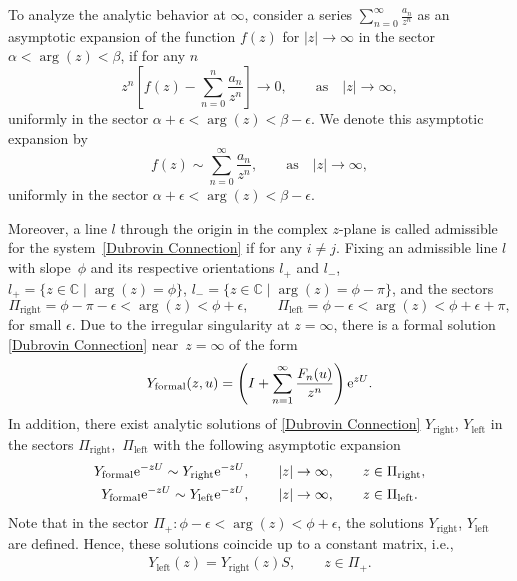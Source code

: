 \documentclass[pdftex]{sigma}
\numberwithin{equation}{section}
\begin{document}
To analyze the analytic behavior at $\infty$, consider a series
$\sum_{n=0}^{\infty} \frac{a_n}{z^n}$
as an asymptotic expansion of the function $f(z)$ for
$
\lvert z \rvert \to \infty$ in the sector $\alpha < \arg(z) < \beta$,
if for any $n$
\[
z^n\left[f(z)- \sum_{n=0}^{n} \frac{a_n}{z^n} \right] \to 0, \qquad \text{as} \quad \lvert z \rvert \to \infty,
\]
uniformly in the sector $ \alpha+\epsilon < \arg(z) < \beta-\epsilon$.
We denote this asymptotic expansion by{\samepage
\[
f(z)\sim\sum_{n=0}^{\infty} \frac{a_n}{z^n} , \qquad \text{as} \quad \lvert z \rvert \to \infty,
\]
uniformly in the sector $\alpha+\epsilon < \arg(z) < \beta-\epsilon$.}


Moreover, a line \(l\) through the origin in the complex \(z\)-plane is called admissible for the system~\eqref{Dubrovin Connection} if
 for any $ i \neq j$.
Fixing an admissible line \(l\) with slope~\(\phi\) and its respective orientations \(l_{+}\) and \(l_{-}\),
$
 l_{+} = \{ z \in \mathbb{C}\mid \arg(z) = \phi\}$, $
 l_{-} = \{ z \in \mathbb{C}\mid \arg(z) = \phi-\pi\}$,
and the sectors
\[
 \Pi_{\text{right}} = \phi-\pi-\epsilon < \arg(z) < \phi+\epsilon,\qquad
 \Pi_{\text{left}} = \phi-\epsilon < \arg(z) < \phi+\epsilon+\pi,
\]
for small \(\epsilon\). Due to the irregular singularity at \(z=\infty\), there is a formal solution \eqref{Dubrovin Connection} near~${z=\infty}$ of the form
\begin{gather}\label{formal solution of Dubrovin connection at infinity}
Y_{\text{formal}}(z,u) = \left(I+\sum_{n=1}^{\infty}\frac{F_n(u)}{z^n} \right){\rm e}^{zU}.
\end{gather}
In addition, there exist analytic solutions of \eqref{Dubrovin Connection} \(Y_{\text{right}}\), \(Y_{\text{left}}\) in the sectors \(\Pi_{\text{right}},\) \(\Pi_{\text{left}}\) with the following asymptotic expansion
\begin{gather*}
 Y_{\text{formal}}{\rm e}^{-zU} \sim Y_{\text{right}}{\rm e}^{-zU} , \qquad \lvert z \rvert \to \infty, \qquad z \in \Pi_{\text{right}},\\
 Y_{\text{formal}}{\rm e}^{-zU} \sim Y_{\text{left}}{\rm e}^{-zU} , \qquad \lvert z \rvert \to \infty, \qquad z \in \Pi_{\text{left}}.
\end{gather*}
Note that in the sector
$
\Pi_{+} \colon \phi-\epsilon < \arg(z) < \phi+\epsilon$,
the solutions \(Y_{\text{right}}\), \(Y_{\text{left}}\) are defined. Hence, these solutions coincide up to a constant matrix, i.e.,
\begin{gather}\label{Stokes matrix definition}
 Y_{\text{left}}(z) = Y_{\text{right}}(z)S, \qquad z \in \Pi_{+}.
\end{gather}
\end{document}
